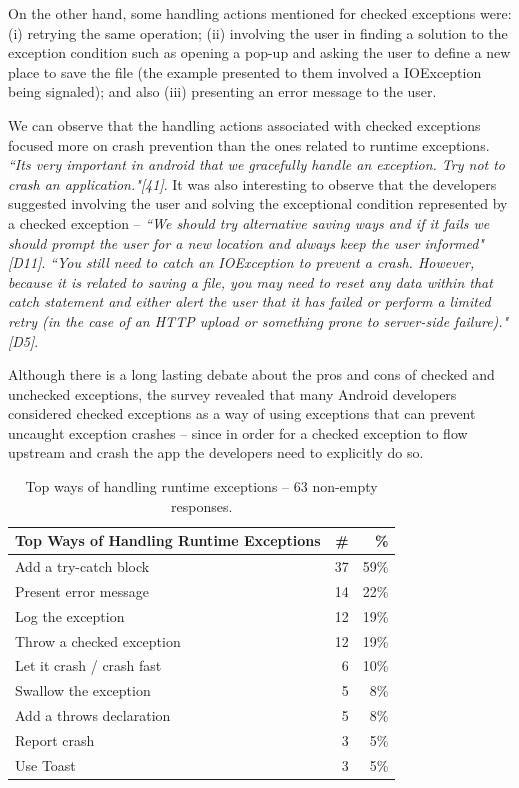 On the other hand, some handling actions mentioned for checked exceptions were: (i) retrying the same operation; (ii) involving the user in finding a solution to the exception condition such as opening a pop-up and asking the user to define a new place to save the file (the example presented to them involved a IOException being signaled); and also (iii) presenting an error message to the user. 

We can observe that the handling actions associated with checked exceptions focused more on crash prevention than the ones related to runtime exceptions. \emph{``Its very important in android that we gracefully handle an exception. Try not to crash an application."[41]}. It was also interesting to observe that the developers suggested involving the user and solving the exceptional condition represented by a checked exception -- \emph{``We should try alternative saving ways and if it fails we should prompt the user for a new location and always keep the user informed"[D11]}. \emph{``You still need to catch an IOException to prevent a crash. However, because it is related to saving a file, you may need to reset any data within that catch statement and either alert the user that it has failed or perform a limited retry (in the case of an HTTP upload or something prone to server-side failure)."[D5]}.

 Although there is a long lasting debate about the pros and cons of checked and unchecked exceptions, the survey revealed that many Android developers considered checked exceptions as a way of using exceptions that can prevent uncaught exception crashes -- since in order for a checked exception to flow upstream and crash the app the developers need to explicitly do so. 				

\begin{table}
\scriptsize
\centering
\begin{tabular}{lrr}
\hline
\bfseries{Top Ways of Handling Runtime Exceptions} & \bfseries{\#} & \bfseries{\%} \\
\hline
Add a try-catch block &	37 &	59\% \\
Present error message	&  14 &	22\% \\
Log the exception	& 12 &	19\% \\
Throw a checked exception	& 12 & 19\% \\
Let it crash / crash fast 	& 6 &	10\% \\
Swallow the exception	& 5 &	8\% \\
Add a throws declaration	& 5 &	8\% \\
Report crash &	3 &	5\% \\
Use Toast & 	3 &	5\% \\
\hline
\end{tabular}
\caption{Top ways of handling runtime exceptions -- 63 non-empty responses. }
\label{tab:handlingruntime}
\end{table}		


